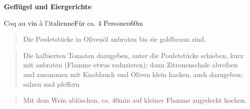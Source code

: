\documentclass[
  a4paper,
]{article}
\begin{document}
\newpage
\vspace*{\fill}

\textbf{\Huge \sf Geflügel und Eiergerichte} \vspace*{\fill}
\thispagestyle{empty} \newpage

\begin{recipe}{Coq au vin à l’italienne}{Für ca. 4 Personen}{60m}


\begin{quote}
Die Pouletstücke in Olivenöl anbraten bis sie goldbraun sind.
\end{quote}

\freeform\hrulefill


\begin{quote}
Die halbierten Tomaten dazugeben, unter die Pouletstücke schieben, kurz
mit anbraten (Flamme etwas reduzieren); dann Zitronenschale abreiben und
zusammen mit Knoblauch und Oliven klein hacken, auch dazugeben; salzen
und pfeffern
\end{quote}

\freeform\hrulefill


\begin{quote}
Mit dem Wein ablöschen, ca. 40min auf kleiner Flamme zugedeckt kochen.
\end{quote}

\freeform\hrulefill\newline\freeform{}\end{recipe}

\newpage
\end{document}
